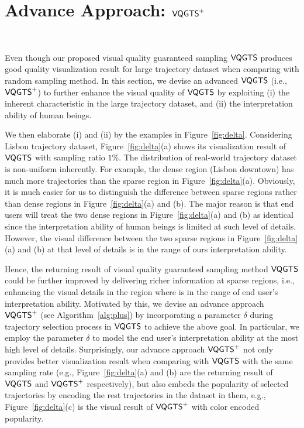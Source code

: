 




\section{Advance Approach: $\mathsf{VQGTS}^{+}$}~\label{sec:aa}


Even though our proposed visual quality guaranteed sampling $\mathsf{VQGTS}$ produces good quality visualization result for large trajectory dataset when comparing with random sampling method.
In this section, we devise an advanced $\mathsf{VQGTS}$ (i.e., $\mathsf{VQGTS}^{+}$) to further enhance the visual quality of $\mathsf{VQGTS}$ by exploiting
(i) the inherent characteristic in the large trajectory dataset, and (ii) the interpretation ability of human beings.

We then elaborate (i) and (ii) by the examples in Figure~\ref{fig:delta}.
Considering Lisbon trajectory dataset, Figure~\ref{fig:delta}(a) shows its visualization result of $\mathsf{VQGTS}$ with sampling ratio $1\%$.
The distribution of real-world trajectory dataset is non-uniform inherently.
For example, the dense region (Lisbon downtown) has much more trajectories than the sparse region in Figure~\ref{fig:delta}(a).
Obviously, it is much easier for us to distinguish the difference between sparse regions rather than dense regions in Figure~\ref{fig:delta}(a) and (b).
The major reason is that end users will treat the two dense regions in Figure~\ref{fig:delta}(a) and (b) as identical
since the interpretation ability of human beings is limited at such level of details.
However, the visual difference between the two sparse regions in Figure~\ref{fig:delta}(a) and (b) at that level of details is in the range of ours interpretation ability.

Hence, the returning result of visual quality guaranteed sampling method $\mathsf{VQGTS}$ could be further improved by delivering richer information at sparse regions,
i.e., enhancing the visual details in the region where is in the range of end user's interpretation ability.
Motivated by this, we devise an advance approach $\mathsf{VQGTS}^{+}$ (see Algorithm~\ref{alg:plus}) by incorporating a parameter $\delta$ during trajectory selection process in $\mathsf{VQGTS}$ to achieve the above goal.
In particular, we employ the parameter $\delta$ to model the end user's interpretation ability at the most high level of details.
Surprisingly, our advance approach $\mathsf{VQGTS}^{+}$ not only provides better visualization result when comparing with $\mathsf{VQGTS}$ with the same sampling rate
(e.g., Figure~\ref{fig:delta}(a) and (b) are the returning result of $\mathsf{VQGTS}$ and $\mathsf{VQGTS}^{+}$ respectively),
but also embeds the popularity of selected trajectories by encoding the rest trajectories in the dataset in them,
e.g., Figure~\ref{fig:delta}(c) is the visual result of $\mathsf{VQGTS}^{+}$ with color encoded popularity.


